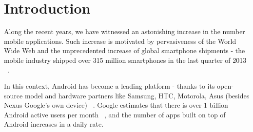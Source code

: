 \documentclass[conference]{IEEEtran}
\begin{document}




\section{Introduction}

Along the recent years, we have witnessed an astonishing increase in the number 
mobile applications. Such increase is motivated by pervasiveness of the World Wide Web 
and the unprecedented increase of global smartphone shipments -
the mobile industry shipped over 315 million smartphones in the last quarter of 2013 ~\cite{googleio}.


In this context, Android has become a leading platform - thanks to its open-source 
model and hardware partners like Samsung, HTC, Motorola, Asus (besides Nexus Google's
 own device) ~\cite{gartner}.  Google estimates that there is over 1 billion Android active users per month ~\cite{googleio},
and the number of apps built on top of Android increases in a daily rate.



\end{document}
